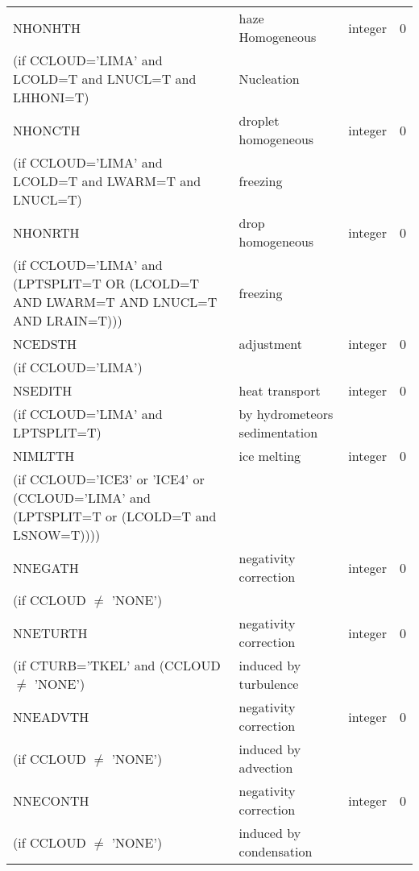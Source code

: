 \begin{longtable} {|p{}|p{}|>{\centering}p{}|p{}<{\centering}|}
NHONHTH   & haze Homogeneous       & integer  &  0 \index{NHONHTH!\innam{NAM\_BU\_RTH}}\\ \nopagebreak
(if CCLOUD='LIMA' and LCOLD=T and LNUCL=T and LHHONI=T)   &   Nucleation&       &   \\\hline
NHONCTH   &  droplet homogeneous      & integer  &  0 \index{NHONCTH!\innam{NAM\_BU\_RTH}}\\ \nopagebreak
(if CCLOUD='LIMA' and LCOLD=T and LWARM=T and LNUCL=T)   &freezing   &       &   \\\hline
NHONRTH   & drop homogeneous       & integer  &  0 \index{NHONRTH!\innam{NAM\_BU\_RTH}}\\ \nopagebreak
(if CCLOUD='LIMA' and (LPTSPLIT=T OR (LCOLD=T AND LWARM=T AND LNUCL=T AND LRAIN=T)))   & freezing  &       &   \\\hline
NCEDSTH   & adjustment      & integer  &  0 \index{NCEDSTH!\innam{NAM\_BU\_RTH}}\\ \nopagebreak
(if CCLOUD='LIMA')   &   &       &   \\\hline
NSEDITH   &  heat transport & integer  &  0 \index{NSEDITH!\innam{NAM\_BU\_RTH}}\\ \nopagebreak
(if CCLOUD='LIMA' and LPTSPLIT=T)   &by hydrometeors sedimentation   &       &   \\\hline
NIMLTTH   & ice melting      & integer  &  0 \index{NIMLTTH!\innam{NAM\_BU\_RTH}}\\ \nopagebreak
(if CCLOUD='ICE3' or 'ICE4' or (CCLOUD='LIMA' and (LPTSPLIT=T or (LCOLD=T and LSNOW=T)))) & &   &  \\\hline
NNEGATH  & negativity correction & integer  &  0 \index{NNEGATH!\innam{NAM\_BU\_RTH}}\\\hline
(if CCLOUD $\neq$ 'NONE') & &   &  \\\hline
 NNETURTH  &  negativity correction      & integer  &  0 \index{NNETURTH!\innam{NAM\_BU\_RTH}}\\ \nopagebreak
(if CTURB='TKEL' and (CCLOUD $\neq$ 'NONE')   &induced by turbulence   &       &   \\\hline
 NNEADVTH  & negativity correction       & integer  &  0 \index{NNEADVTH!\innam{NAM\_BU\_RTH}}\\ \nopagebreak
(if CCLOUD $\neq$ 'NONE')   &induced by advection   &       &   \\\hline
 NNECONTH  & negativity correction       & integer  &  0 \index{NNECONTH!\innam{NAM\_BU\_RTH}}\\ \nopagebreak
(if CCLOUD $\neq$ 'NONE')   &induced by condensation   &       &   \\\hline
\end{longtable}

